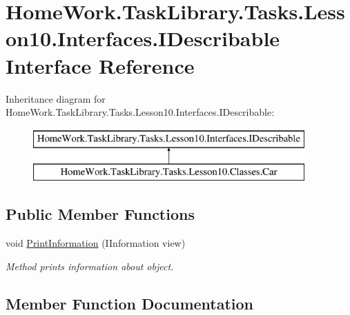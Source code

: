 \hypertarget{interface_home_work_1_1_task_library_1_1_tasks_1_1_lesson10_1_1_interfaces_1_1_i_describable}{}\section{Home\+Work.\+Task\+Library.\+Tasks.\+Lesson10.\+Interfaces.\+I\+Describable Interface Reference}
\label{interface_home_work_1_1_task_library_1_1_tasks_1_1_lesson10_1_1_interfaces_1_1_i_describable}
Inheritance diagram for Home\+Work.\+Task\+Library.\+Tasks.\+Lesson10.\+Interfaces.\+I\+Describable\+:\begin{figure}[H]
\begin{center}
\leavevmode
\includegraphics[height=2.000000cm]{interface_home_work_1_1_task_library_1_1_tasks_1_1_lesson10_1_1_interfaces_1_1_i_describable}
\end{center}
\end{figure}
\subsection*{Public Member Functions}
\begin{DoxyCompactItemize}
\item 
void \mbox{\hyperlink{interface_home_work_1_1_task_library_1_1_tasks_1_1_lesson10_1_1_interfaces_1_1_i_describable_a38fb49a7a569c7ea7381bfe957960d82}{Print\+Information}} (I\+Information view)
\begin{DoxyCompactList}\small\item\em Method prints information about object. \end{DoxyCompactList}\end{DoxyCompactItemize}


\subsection{Member Function Documentation}
\mbox{\label{interface_home_work_1_1_task_library_1_1_tasks_1_1_lesson10_1_1_interfaces_1_1_i_describable_a38fb49a7a569c7ea7381bfe957960d82}} 

